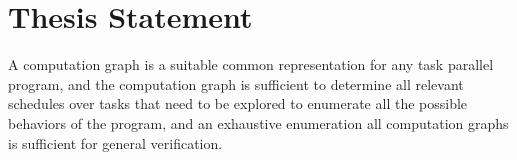 \section{Thesis Statement}
A computation graph is a suitable common representation for any task parallel program, and the computation graph is sufficient to determine all relevant schedules over tasks that need to be explored to enumerate all the possible behaviors of the program, and an exhaustive enumeration all computation graphs is sufficient for general verification.
